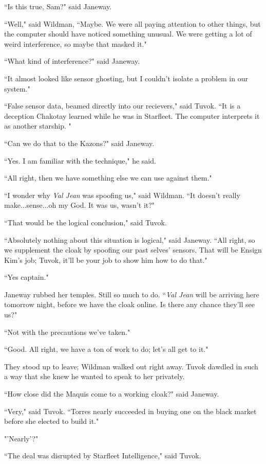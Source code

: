\documentclass[twoside,letterpaper,12pt]{memoir}
\begin{document}
``Is this true, Sam?" said Janeway. 

``Well," said Wildman, ``Maybe. We were all paying attention to other things, but the computer should have noticed something unusual. We were getting a lot of weird interference, so maybe that masked it." 

``What kind of interference?" said Janeway. 

``It almost looked like sensor ghosting, but I couldn't isolate a problem in our system." 

``False sensor data, beamed directly into our recievers," said Tuvok. ``It is a deception Chakotay learned while he was in Starfleet. The computer interprets it as another starship. " 

``Can we do that to the Kazons?" said Janeway. 

``Yes. I am familiar with the technique," he said. 

``All right, then we have something else we can use against them." 

``I wonder why \textit{Val Jean} was spoofing us," said Wildman. ``It doesn't really make...sense...oh my God. It was us, wasn't it?" 

``That would be the logical conclusion," said Tuvok. 

``Absolutely nothing about this situation is logical," said Janeway. ``All right, so we supplement the cloak by spoofing our past selves' sensors. That will be Ensign Kim's job; Tuvok, it'll be your job to show him how to do that." 

``Yes captain." 

Janeway rubbed her temples. Still so much to do. ``\textit{Val Jean} will be arriving here tomorrow night, before we have the cloak online. Is there any chance they'll see us?" 

``Not with the precautions we’ve taken." 

``Good. All right, we have a ton of work to do; let's all get to it." 

They stood up to leave; Wildman walked out right away. Tuvok dawdled in such a way that she knew he wanted to speak to her privately. 

``How close did the Maquis come to a working cloak?" said Janeway. 

``Very," said Tuvok. ``Torres nearly succeeded in buying one on the black market before she elected to build it." 

"'Nearly'?" 

``The deal was disrupted by Starfleet Intelligence," said Tuvok. 
\end{document}
